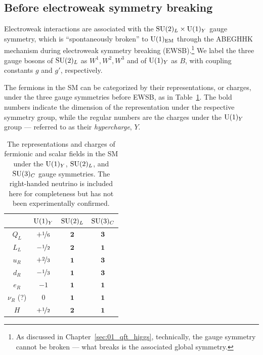 \subsection{Before electroweak symmetry breaking}

Electroweak interactions are associated with the $\SU[2]_L \times \UU[1]_Y$ gauge symmetry, which is ``spontaneously broken'' to $\UU[1]_{\text{EM}}$ through the ABEGHHK mechanism during electroweak symmetry breaking (EWSB).\footnote{As discussed in Chapter~\ref{sec:01_qft_higgs}, technically, the gauge symmetry cannot be broken --- what breaks is the associated global symmetry.}
We label the three gauge bosons of $\SU[2]_L$ as $W^1, W^2, W^3$ and of $\UU[1]_Y$ as $B$, with coupling constants $g$ and $g'$, respectively.

The fermions in the SM can be categorized by their representations, or charges, under the three gauge symmetries before EWSB, as in Table~\ref{tab:01_sm_ew_fermions}.
The bold numbers indicate the dimension of the representation under the respective symmetry group, while the regular numbers are the charges under the $\UU[1]_Y$ group --- referred to as their \textit{hypercharge}, $Y$.

\begin{table}[ht]
	\renewcommand{\arraystretch}{1.5}
	\centering
	\begin{tabular}{c|ccc}
		 & $\UU[1]_Y$ & $\SU[2]_L$ & $\SU[3]_C$ \\
		\midrule
		$Q_L$ & $+ \cnicefrac{1}{6}$ & $\mathbf{2}$ & $\mathbf{3}$ \\
		$L_L$ & $- \cnicefrac{1}{2}$ & $\mathbf{2}$ & $\mathbf{1}$ \\
		$u_R$ & $+ \cnicefrac{2}{3}$ & $\mathbf{1}$ & $\mathbf{3}$ \\
		$d_R$ & $- \cnicefrac{1}{3}$ & $\mathbf{1}$ & $\mathbf{3}$ \\
		$e_R$ & $-1$ & $\mathbf{1}$ & $\mathbf{1}$ \\
		$\nu_R$ (?) & $0$ & $\mathbf{1}$ & $\mathbf{1}$ \\
		$H$ & $+ \cnicefrac{1}{2}$ & $\mathbf{2}$ & $\mathbf{1}$ \\
	\end{tabular}
	\vspace{2mm}
	\caption{The representations and charges of fermionic and scalar fields in the SM under the $\UU[1]_Y$, $\SU[2]_L$, and $\SU[3]_C$ gauge symmetries. 
	The right-handed neutrino is included here for completeness but has not been experimentally confirmed.}
	\label{tab:01_sm_ew_fermions}
\end{table}

